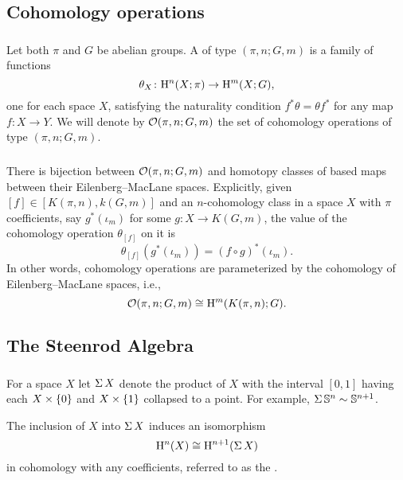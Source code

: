 \subsection{Cohomology operations}

\subsubsection{}
Let both $\pi$ and $G$ be abelian groups.
A  of type $(\pi, n; G, m)$ is a family of functions
\[
\theta_X \colon \mathrm{H}^n(X; \pi) \to \mathrm{H}^m(X; G),
\]
one for each space $X$, satisfying the naturality condition $f^* \theta = \theta f^*$ for any map $f \colon X \to Y$.
We will denote by $\mathcal{O}(\pi, n; G,m)$ the set of cohomology operations of type $(\pi, n; G,m)$.

\subsubsection{}
There is bijection between $\mathcal{O}(\pi, n; G,m)$ and homotopy classes of based maps between their Eilenberg--MacLane spaces.
Explicitly, given $[f] \in [K(\pi,n), k(G,m)]$ and an $n$-cohomology class in a space $X$ with $\pi$ coefficients, say $g^*(\iota_m)$ for some $g \colon X \to K(G, m)$, the value of the cohomology operation $\theta_{[f]}$ on it is
\[
\theta_{[f]}(g^*(\iota_m)) = (f \circ g)^*(\iota_m).
\]
In other words, cohomology operations are parameterized by the cohomology of Eilenberg--MacLane spaces, i.e.,
\[
\mathcal{O}(\pi, n; G,m) \cong \mathrm{H}^m(K(\pi,n); G).
\]

\subsection{The Steenrod Algebra}\label{ss:steenrod}

\subsubsection{} For a space $X$ let $\operatorname{\Sigma} X$ denote the product of $X$ with the interval $[0,1]$ having each $X \times \{0\}$ and $X \times \{1\}$ collapsed to a point.
For example, $\operatorname{\Sigma} \mathbb{S}^n \sim \mathbb{S}^{n+1}$.

The inclusion of $X$ into $\operatorname{\Sigma} X$ induces an isomorphism
\[
\mathrm{H}^n(X) \cong \mathrm{H}^{n+1}(\operatorname{\Sigma} X)
\]
in cohomology with any coefficients, referred to as the .

